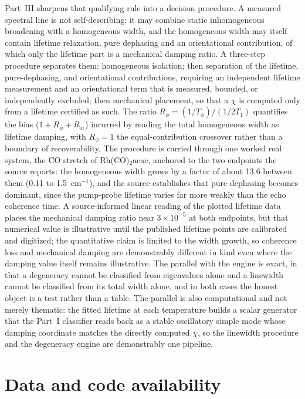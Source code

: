 Part~III sharpens that qualifying rule into a decision procedure. A measured spectral line is not self-describing: it may combine static inhomogeneous broadening with a homogeneous width, and the homogeneous width may itself contain lifetime relaxation, pure dephasing and an orientational contribution, of which only the lifetime part is a mechanical damping ratio. A three-step procedure separates them: homogeneous isolation; then separation of the lifetime, pure-dephasing, and orientational contributions, requiring an independent lifetime measurement and an orientational term that is measured, bounded, or independently excluded; then mechanical placement, so that a \(\chi\) is computed only from a lifetime certified as such. The ratio \(R_\phi = (1/T_\phi)/(1/2T_1)\) quantifies the bias (\(1 + R_\phi + R_{\mathrm{or}}\)) incurred by reading the total homogeneous width as lifetime damping, with \(R_\phi = 1\) the equal-contribution crossover rather than a boundary of recoverability. The procedure is carried through one worked real system, the CO stretch of Rh(CO)$_2$acac, anchored to the two endpoints the source reports: the homogeneous width grows by a factor of about 13.6 between them (0.11 to 1.5~cm$^{-1}$), and the source establishes that pure dephasing becomes dominant, since the pump-probe lifetime varies far more weakly than the echo coherence time. A source-informed linear reading of the plotted lifetime data places the mechanical damping ratio near $3\times10^{-5}$ at both endpoints, but that numerical value is illustrative until the published lifetime points are calibrated and digitized; the quantitative claim is limited to the width growth, so coherence loss and mechanical damping are demonstrably different in kind even where the damping value itself remains illustrative. The parallel with the engine is exact, in that a degeneracy cannot be classified from eigenvalues alone and a linewidth cannot be classified from its total width alone, and in both cases the honest object is a test rather than a table. The parallel is also computational and not merely thematic: the fitted lifetime at each temperature builds a scalar generator that the Part~I classifier reads back as a stable oscillatory simple mode whose damping coordinate matches the directly computed $\chi$, so the linewidth procedure and the degeneracy engine are demonstrably one pipeline.

\section*{Data and code availability}

